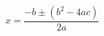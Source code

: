 \documentclass{article}
\begin{document}
	\begin{equation*}
		x=\frac{-b\pm(b^2-4ac)}{2a}
	\end{equation*}
\end{document}
